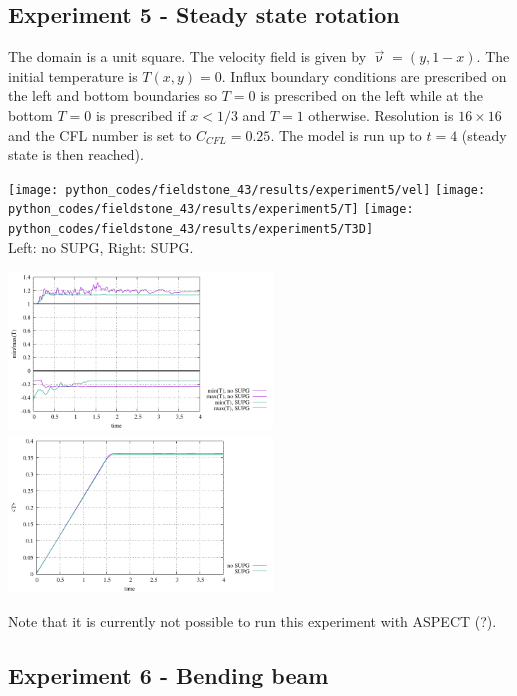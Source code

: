 \subsection*{Experiment 5 - Steady state rotation }

The domain is a unit square. The velocity field is given by $\vec\upnu=(y,1-x)$. 
The initial temperature is $T(x,y)=0$. 
Influx boundary conditions are prescribed on the left and bottom boundaries so
$T=0$ is prescribed on the left while at the bottom $T=0$ is prescribed if $x<1/3$ and $T=1$
otherwise. Resolution is $16\times16$ and the CFL number is set to $C_{CFL}=0.25$. 
The model is run up to $t=4$ (steady state is then reached).

\begin{center}
\texttt{[image: python\_codes/fieldstone\_43/results/experiment5/vel]}
\texttt{[image: python\_codes/fieldstone\_43/results/experiment5/T]}
\texttt{[image: python\_codes/fieldstone\_43/results/experiment5/T3D]}\\
{\captionfont Left: no SUPG, Right: SUPG.}
\end{center}


\begin{center}
\includegraphics[width=7cm]{python_codes/fieldstone_43/results/experiment5/stats_T}
\includegraphics[width=7cm]{python_codes/fieldstone_43/results/experiment5/avrg_T}
\end{center}

Note that it is currently not possible to run this experiment with ASPECT (?).

\newpage
\subsection*{Experiment 6 - Bending beam}

